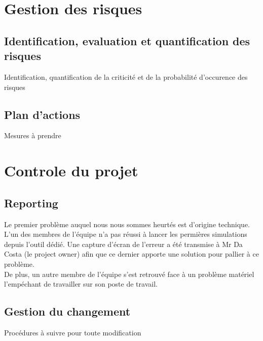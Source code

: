 \documentclass{article}
\begin{document}
\section{Gestion des risques}
\subsection{Identification, evaluation et quantification des risques}
Identification, quantification de la criticité et de la probabilité d'occurence des risques
\subsection{Plan d'actions}
Mesures à prendre

\section{Controle du projet}
\subsection{Reporting}
Le premier problème auquel nous nous sommes heurtés est d'origine technique. L'un des membres de l'équipe n'a pas réussi à lancer les permières simulations depuis l'outil dédié. Une capture d'écran de l'erreur a été transmise à Mr Da Costa (le project owner) afin que ce dernier apporte une solution pour pallier à ce problème. \\
De plus, un autre membre de l'équipe s'est retrouvé face à un problème matériel l'empéchant de travailler sur son poste de travail.

\subsection{Gestion du changement}
Procédures à suivre pour toute modification


\printglossary
\end{document}
